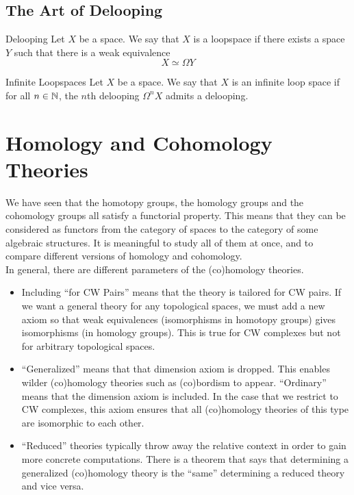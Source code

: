 \documentclass[a4paper]{article}
\begin{document}
\subsection{The Art of Delooping}
\begin{defn}{Delooping}{} Let $X$ be a space. We say that $X$ is a loopspace if there exists a space $Y$ such that there is a weak equivalence $$X\simeq\Omega Y$$
\end{defn}

\begin{defn}{Infinite Loopspaces}{} Let $X$ be a space. We say that $X$ is an infinite loop space if for all $n\in\mathbb{N}$, the $n$th delooping $\Omega^n X$ admits a delooping. 
\end{defn}

\pagebreak
\section{Homology and Cohomology Theories}
We have seen that the homotopy groups, the homology groups and the cohomology groups all satisfy a functorial property. This means that they can be considered as functors from the category of spaces to the category of some algebraic structures. It is meaningful to study all of them at once, and to compare different versions of homology and cohomology. \\

In general, there are different parameters of the (co)homology theories. 
\begin{itemize}
\item Including ``for CW Pairs'' means that the theory is tailored for CW pairs. If we want a general theory for any topological spaces, we must add a new axiom so that weak equivalences (isomorphisms in homotopy groups) gives isomorphisms (in homology groups). This is true for CW complexes but not for arbitrary topological spaces. 
\item ``Generalized'' means that that dimension axiom is dropped. This enables wilder (co)homology theories such as (co)bordism to appear. ``Ordinary'' means that the dimension axiom is included. In the case that we restrict to CW complexes, this axiom ensures that all (co)homology theories of this type are isomorphic to each other. 
\item ``Reduced'' theories typically throw away the relative context in order to gain more concrete computations. There is a theorem that says that determining a generalized (co)homology theory is the ``same'' determining a reduced theory and vice versa. 
\end{itemize}
\end{document}
